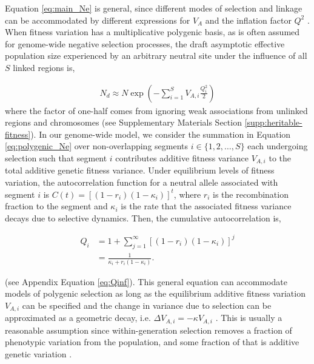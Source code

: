 \documentclass[11pt]{article}
\begin{document}
Equation \eqref{eq:main_Ne} is general, since different modes of selection and
linkage can be accommodated by different expressions for $V_A$ and the
inflation factor $Q^2$ \parencite{Santiago1995-hx,Santiago1998-bs}. When
fitness variation has a multiplicative polygenic basis, as is often assumed for
genome-wide negative selection processes, the draft asymptotic effective
population size experienced by an arbitrary neutral site under the influence of
all $S$ linked regions is,

\begin{align}
    \label{eq:polygenic_Ne}
    N_d \approx N \exp\left(-\sum_{i=1}^S V_{A,i} \frac{Q_i^2}{2}\right)
\end{align}
%
where the factor of one-half comes from ignoring weak associations from
unlinked regions and chromosomes (see Supplementary Materials Section
\ref{supp:heritable-fitness}). In our genome-wide model, we consider the
summation in Equation \eqref{eq:polygenic_Ne} over non-overlapping segments $i
\in \{1, 2, \ldots, S\}$ each undergoing selection such that segment $i$
contributes additive fitness variance $V_{A,i}$ to the total additive genetic
fitness variance. Under equilibrium levels of fitness variation, the
autocorrelation function for a neutral allele associated with segment $i$ is
$C(t) = [(1-r_i)(1-\kappa_i)]^t$, where $r_i$ is the recombination fraction to
the segment and $\kappa_i$ is the rate that the associated fitness variance
decays due to selective dynamics. Then, the cumulative autocorrelation is,

\begin{align}
    \label{eq:Q}
    Q_i &= 1 + \sum_{j=1}^\infty \left[(1-r_i)(1-\kappa_i)\right]^j \nonumber \\
        &= \frac{1}{\kappa_i + r_i(1-\kappa_i)}.
\end{align}

(see Appendix Equation \ref{eq:Qinf}). This general equation can accommodate
models of polygenic selection as long as the equilibrium additive fitness
variation $V_{A,i}$ can be specified and the change in variance due to
selection can be approximated as a geometric decay, i.e. $\Delta V_{A,i} =
-\kappa V_{A,i}$ \parencite{Bulmer1971-ae,Keightley1988-eq,Walsh2018-bt}. This
is usually a reasonable assumption since within-generation selection removes a
fraction of phenotypic variation from the population, and some fraction of that
is additive genetic variation \parencite{Bulmer1971-ae,Keightley1988-eq}.
\end{document}
